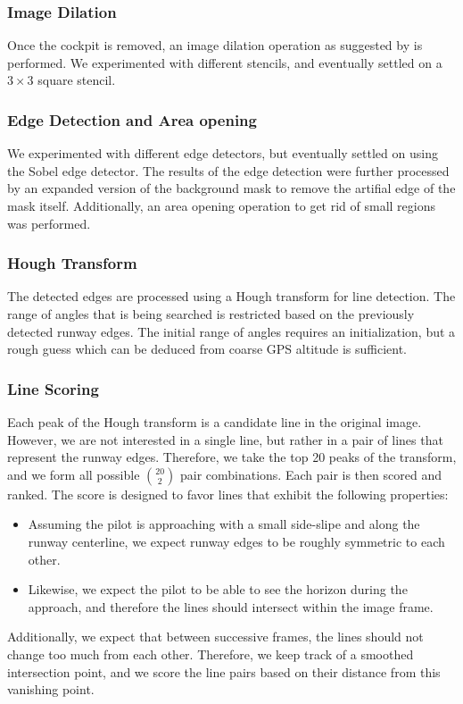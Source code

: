 \documentclass[letterpaper, conference]{IEEEtran}  %
\begin{document}
\subsubsection*{\textbf{Image Dilation}}
Once the cockpit is removed, an image dilation operation as suggested by \cite{Naidu2011} is performed. We experimented with different stencils, and eventually settled on a $3\times3$ square stencil.
\subsubsection*{\textbf{Edge Detection and Area opening}}
We experimented with different edge detectors, but eventually settled on using the Sobel edge detector. The results of the edge detection were further processed by an expanded version of the background mask to remove the artifial edge of the mask itself. Additionally, an area opening operation to get rid of small regions was performed.
\subsubsection*{\textbf{Hough Transform}}
The detected edges are processed using a Hough transform for line detection. The range of angles that is being searched is restricted based on the previously detected runway edges. The initial range of angles requires an initialization, but a rough guess which can be deduced from coarse GPS altitude is sufficient.
\subsubsection*{\textbf{Line Scoring}} 
\label{sec:pipeline:score}
Each peak of the Hough transform is a candidate line in the original image. However, we are not interested in a single line, but rather in a pair of lines that represent the runway edges. Therefore, we take the top 20 peaks of the transform, and we form all possible $\binom{20}{2}$ pair combinations. Each pair is then scored and ranked. The score is designed to favor lines that exhibit the following properties:
\begin{itemize}
\item Assuming the pilot is approaching with a small side-slipe and along the runway centerline, we expect runway edges to be roughly symmetric to each other.
\item Likewise, we expect the pilot to be able to see the horizon during the approach, and therefore the lines should intersect within the image frame.
\end{itemize}
Additionally, we expect that between successive frames, the lines should not change too much from each other. Therefore, we keep track of a smoothed intersection point, and we score the line pairs based on their distance from this vanishing point.
\end{document}
